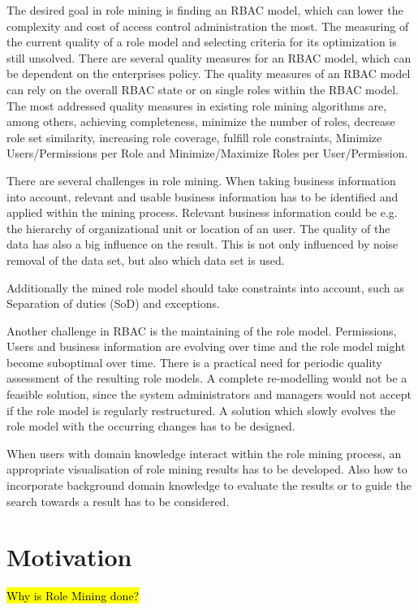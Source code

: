 The desired goal in role mining is finding an RBAC model, which can lower the complexity and cost of access control administration the most. The measuring of the current quality of a role model and selecting criteria for its optimization is still unsolved. There are several quality measures for an RBAC model, which can be dependent on the enterprises policy. The quality measures of an RBAC model can rely on the overall RBAC state or on single roles within the RBAC model. The most addressed quality measures in existing role mining algorithms are, among others, achieving completeness, minimize the number of roles, decrease role set similarity, increasing role coverage, fulfill role constraints, Minimize Users/Permissions per Role and Minimize/Maximize Roles per User/Permission\cite{Kunz}.

There are several challenges in role mining. When taking business information into account, relevant and usable business information has to be identified and applied within the mining process. Relevant business information could be e.g. the hierarchy of organizational unit or location of an user. The quality of the data has also a big influence on the result. This is not only influenced by noise removal of the data set, but also which data set is used.

Additionally the mined role model should take constraints into account, such as Separation of duties (SoD) and exceptions. \cite{Lu}

Another challenge in RBAC is the maintaining of the role model. Permissions, Users and business information are evolving over time and the role model might become suboptimal over time. There is a practical need for periodic quality assessment of the resulting role models\cite{Kunz}. A complete re-modelling would not be a feasible solution, since the system administrators and managers would not accept if the role model is regularly restructured. A solution which slowly evolves the role model with the occurring changes has to be designed.

When users with domain knowledge interact within the role mining process, an appropriate visualisation of role mining results has to be developed. Also how to incorporate background domain knowledge to evaluate the results or to guide the search towards a result has to be considered. \cite{Han}


\section{Motivation}
\hl{Why is Role Mining done?}

